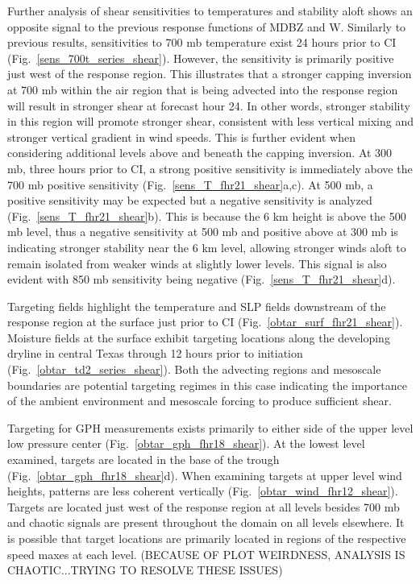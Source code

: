\documentclass{ttuthes2007}
\newcommand{\tab}{\hspace*{2em}}  %
\begin{document}
\tab Further analysis of shear sensitivities to temperatures and stability aloft shows an opposite signal to the previous response functions of MDBZ and W. Similarly to previous results, sensitivities to 700 mb temperature exist 24 hours prior to CI (Fig.~\ref{sens_700t_series_shear}). However, the sensitivity is primarily positive just west of the response region. This illustrates that a stronger capping inversion at 700 mb within the air region that is being advected into the response region will result in stronger shear at forecast hour 24. In other words, stronger stability in this region will promote stronger shear, consistent with less vertical mixing and stronger vertical gradient in wind speeds. This is further evident when considering additional levels above and beneath the capping inversion. At 300 mb, three hours prior to CI, a strong positive sensitivity is immediately above the 700 mb positive sensitivity (Fig.~\ref{sens_T_fhr21_shear}a,c). At 500 mb, a positive sensitivity may be expected but a negative sensitivity is analyzed (Fig.~\ref{sens_T_fhr21_shear}b). This is because the 6 km height is above the 500 mb level, thus a negative sensitivity at 500 mb and positive above at 300 mb is indicating stronger stability near the 6 km level, allowing stronger winds aloft to remain isolated from weaker winds at slightly lower levels. This signal is also evident with 850 mb sensitivity being negative (Fig.~\ref{sens_T_fhr21_shear}d).

\tab Targeting fields highlight the temperature and SLP fields downstream of the response region at the surface just prior to CI (Fig.~\ref{obtar_surf_fhr21_shear}). Moisture fields at the surface exhibit targeting locations along the developing dryline in central Texas through 12 hours prior to initiation (Fig.~\ref{obtar_td2_series_shear}). Both the advecting regions and mesoscale boundaries are potential targeting regimes in this case indicating the importance of the ambient environment and mesoscale forcing to produce sufficient shear. 

\tab Targeting for GPH measurements exists primarily to either side of the upper level low pressure center (Fig.~\ref{obtar_gph_fhr18_shear}). At the lowest level examined, targets are located in the base of the trough (Fig.~\ref{obtar_gph_fhr18_shear}d). When examining targets at upper level wind heights, patterns are less coherent vertically (Fig.~\ref{obtar_wind_fhr12_shear}). Targets are located just west of the response region at all levels besides 700 mb and chaotic signals are present throughout the domain on all levels elsewhere. It is possible that target locations are primarily located in regions of the respective speed maxes at each level. (BECAUSE OF PLOT WEIRDNESS, ANALYSIS IS CHAOTIC...TRYING TO RESOLVE THESE ISSUES)
\end{document}
